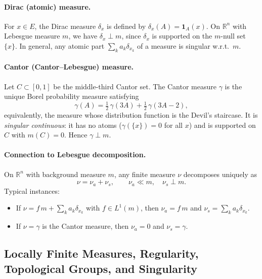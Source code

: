 \documentclass[12pt,a4paper]{article}
\theoremstyle{plain}
\theoremstyle{definition}
\theoremstyle{remark}
\theoremstyle{remark}
\theoremstyle{definition}
\begin{document}
	\bigskip
	
	\paragraph{Dirac (atomic) measure.}
	For \(x\in E\), the Dirac measure \(\delta_x\) is defined by \(\delta_x(A)=\mathbf{1}_A(x)\).
	On \(\mathbb{R}^n\) with Lebesgue measure \(m\), we have \(\delta_x\perp m\),
	since \(\delta_x\) is supported on the \(m\)-null set \(\{x\}\).
	In general, any atomic part \(\sum_k a_k \delta_{x_k}\) of a measure is singular w.r.t.\ \(m\).
	
	\bigskip
	
	\paragraph{Cantor (Cantor--Lebesgue) measure.}
	Let \(C\subset[0,1]\) be the middle-third Cantor set.
	The Cantor measure \(\gamma\) is the unique Borel probability measure satisfying
	\[
	\gamma(A)=\tfrac12\,\gamma(3A)+\tfrac12\,\gamma(3A-2),
	\]
	equivalently, the measure whose distribution function is the Devil's staircase.
	It is \emph{singular continuous}: it has no atoms (\(\gamma(\{x\})=0\) for all \(x\))
	and is supported on \(C\) with \(m(C)=0\). Hence \(\gamma\perp m\).
	
	\bigskip
	
	\paragraph{Connection to Lebesgue decomposition.}
	On \(\mathbb{R}^n\) with background measure \(m\), any finite measure \(\nu\) decomposes uniquely as
	\[
	\nu=\nu_a+\nu_s,\qquad \nu_a\ll m,\quad \nu_s\perp m.
	\]
	Typical instances:
	\begin{itemize}
		\item If \(\nu=f\,m+\sum_{k} a_k\delta_{x_k}\) with \(f\in L^1(m)\), then
		\(\nu_a=f\,m\) and \(\nu_s=\sum_{k} a_k\delta_{x_k}\).
		\item If \(\nu=\gamma\) is the Cantor measure, then \(\nu_a=0\) and \(\nu_s=\gamma\).
	\end{itemize}
	
	
	
	\subsection*{Locally Finite Measures, Regularity, Topological Groups, and Singularity}
	
\end{document}
